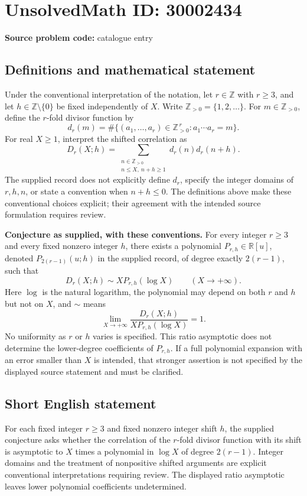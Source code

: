 \documentclass[11pt]{article}
\newcommand{\Z}{\mathbb{Z}}
\newcommand{\R}{\mathbb{R}}
\begin{document}
\section*{UnsolvedMath ID: 30002434}
\textbf{Source problem code:} catalogue entry
\subsection{Definitions and mathematical statement}
Under the conventional interpretation of the notation, let \(r\in\Z\) with \(r\geq3\), and let \(h\in\Z\setminus\{0\}\) be fixed independently of \(X\). Write \(\Z_{>0}=\{1,2,\ldots\}\). For \(m\in\Z_{>0}\), define the \(r\)-fold divisor function by
\[
d_r(m)=\#\bigl\{(a_1,\ldots,a_r)\in\Z_{>0}^{\,r}:a_1\cdots a_r=m\bigr\}.
\]
For real \(X\geq1\), interpret the shifted correlation as
\[
D_r(X;h)=\sum_{\substack{n\in\Z_{>0}\\ n\leq X,\ n+h\geq1}}d_r(n)d_r(n+h).
\]
The supplied record does not explicitly define \(d_r\), specify the integer domains of \(r,h,n\), or state a convention when \(n+h\leq0\). The definitions above make these conventional choices explicit; their agreement with the intended source formulation requires review.

\textbf{Conjecture as supplied, with these conventions.} For every integer \(r\geq3\) and every fixed nonzero integer \(h\), there exists a polynomial \(P_{r,h}\in\R[u]\), denoted \(P_{2(r-1)}(u;h)\) in the supplied record, of degree exactly \(2(r-1)\), such that
\[
D_r(X;h)\sim X P_{r,h}(\log X)\qquad(X\to+\infty).
\]
Here \(\log\) is the natural logarithm, the polynomial may depend on both \(r\) and \(h\) but not on \(X\), and \(\sim\) means
\[
\lim_{X\to+\infty}\frac{D_r(X;h)}{X P_{r,h}(\log X)}=1.
\]
No uniformity as \(r\) or \(h\) varies is specified. This ratio asymptotic does not determine the lower-degree coefficients of \(P_{r,h}\). If a full polynomial expansion with an error smaller than \(X\) is intended, that stronger assertion is not specified by the displayed source statement and must be clarified.
\subsection{Short English statement}
For each fixed integer \(r\geq3\) and fixed nonzero integer shift \(h\), the supplied conjecture asks whether the correlation of the \(r\)-fold divisor function with its shift is asymptotic to \(X\) times a polynomial in \(\log X\) of degree \(2(r-1)\). Integer domains and the treatment of nonpositive shifted arguments are explicit conventional interpretations requiring review. The displayed ratio asymptotic leaves lower polynomial coefficients undetermined.
\end{document}
